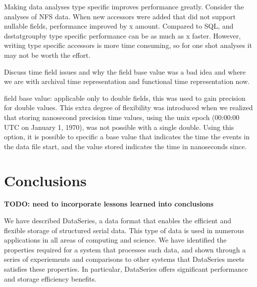 \documentclass{acm_proc_article-sp}
\begin{document}
Making data analyses type specific improves performance greatly.
Consider the analyses of NFS data.  When new accessors were added that
did not support nullable fields, performance improved by x amount.
Compared to SQL, and dsstatgroupby type specific performance can be as
much as x faster.  However, writing type specific accessors is more
time consuming, so for one shot analyses it may not be worth the
effort.

Discuss time field issues and why the field base value was a bad idea
and where we are with archival time representation and functional time
representation now.

field base value: applicable only to double fields,
this was used to gain precision for double values. This extra degree
of flexibility was introduced when we realized that storing nanosecond
precision time values, using the unix epoch (00:00:00 UTC on January
1, 1970), was not possible with a single double. Using this option, it
is possible to specific a base value that indicates the time the
events in the data file start, and the value stored indicates the time
in nanoseconds since.



\section{Conclusions}\label{sec:conclusions}

{\bf TODO: need to incorporate lessons learned into conclusions}

We have described DataSeries, a data format that enables the efficient
and flexible storage of structured serial data. This type of data is
used in numerous applications in all areas of computing and
science. We have identified the properties required for a system that
processes such data, and shown through a series of experiements and
comparisons to other systems that DataSeries meets satisfies these
properties. In particular, DataSeries offers significant performance
and storage efficiency benefits.  


{\small

}
%
%
\balancecolumns
\end{document}

